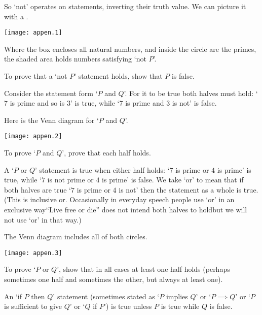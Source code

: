 So `not' operates on statements, inverting their truth value.
We can picture it with a 
.
\begin{center}
  \texttt{[image: appen.1]}
\end{center}
Where the box encloses all natural numbers, and inside the circle are
the primes, the shaded area holds numbers satisfying `not \( P \)'.

To prove that a `not \( P \)' statement holds, show that \( P \) is false.



Consider the statement form `\( P \) and \( Q \)'.
For it to be true both halves must hold:
`\( 7 \) is prime and so is \( 3 \)' is true, while
`\( 7 \) is prime and \( 3 \) is not' is false.

Here is the Venn diagram for `\( P \) and \( Q \)'.
\begin{center}
  \texttt{[image: appen.2]}
\end{center}
To prove `\( P \) and \( Q \)', prove that each half holds.




A `\( P \) or \( Q \)' statement is true when either half holds:
`\( 7 \) is prime or \( 4 \) is prime' is true, while `\( 7 \) is not prime
or \( 4 \) is prime' is false.
We take `or' to mean that if both halves are true
`\( 7 \) is prime or \( 4 \) is not' then the statement as a whole is true.
(This is inclusive or.
Occasionally in everyday speech people use `or' in an exclusive way\Dash ``Live
free or die'' does not intend both halves to hold\Dash but
we will not use `or' in that way.)

The Venn diagram includes all of both circles.
\begin{center}
  \texttt{[image: appen.3]}
\end{center}
To prove `\( P \) or \( Q \)', show that in all cases at least one
half holds (perhaps sometimes one half and sometimes the other,
but always at least one).


An `if \( P \) then \( Q \)' statement (sometimes stated as
`\( P \) implies \( Q \)' or `\( P\implies Q\)' or 
`\( P \) is sufficient to give \( Q \)' or `$Q$ if $P$') 
is true unless \( P \) is true while \( Q \) is false.

